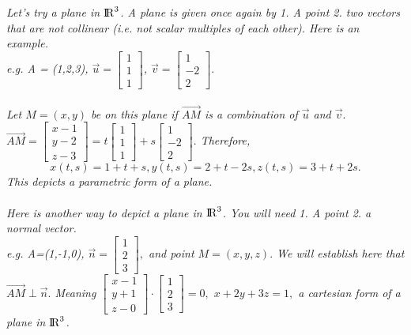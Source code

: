 \documentclass[addpoints]{exam}
\begin{document}
\textit{
Let's try a plane in ${\rm I\!R}^3$. A plane is given once again by 1. A point 2. two vectors that are not collinear (i.e. not scalar multiples of each other). Here is an example.\\
e.g. A = (1,2,3), $\vec{u}=\begin{bmatrix}
    1\\1\\1
\end{bmatrix}$, $\vec{v}=\begin{bmatrix}
    1\\-2\\2
\end{bmatrix}.$\\\\
Let $M=(x,y)$ be on this plane if $\vec{AM}$ is a combination of $\vec{u}$ and $\vec{v}.$ $\vec{AM}= \begin{bmatrix}
    x-1\\y-2\\z-3
\end{bmatrix}=t\begin{bmatrix}
    1\\1\\1
\end{bmatrix}+s\begin{bmatrix}
    1\\-2\\2
\end{bmatrix}.$ Therefore, \[
x(t,s)=1+t+s, y(t,s)=2+t-2s, z(t,s)=3+t+2s.
\] This depicts a parametric form of a plane. \\\\
}
\textit{
Here is another way to depict a plane in ${\rm I\!R}^3$. You will need 1. A point 2. a normal vector.\\
e.g. A=(1,-1,0), $\vec{n}=\begin{bmatrix}
    1\\2\\3
\end{bmatrix},$ and point $M=(x,y,z).$ We will establish here that $\vec{AM}\perp\vec{n}.$ Meaning $\begin{bmatrix}
    x-1\\y+1\\z-0
\end{bmatrix}\cdot\begin{bmatrix}
    1\\2\\3
\end{bmatrix}=0,$ $x+2y+3z=1,$ a cartesian form of a plane in ${\rm I\!R}^3$. \\\\
}
\end{document}
